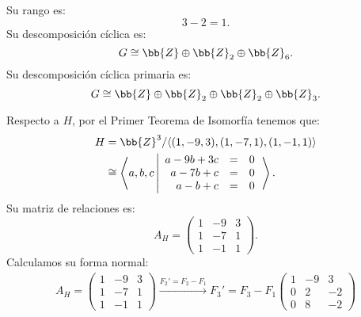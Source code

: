 \begin{ejercicio}
\begin{enumerate}
        Su rango es:
        \begin{equation*}
            3-2= 1.
        \end{equation*}
        Su descomposición cíclica es:
        \begin{equation*}
            G \cong \bb{Z}\oplus \bb{Z}_2 \oplus \bb{Z}_6.
        \end{equation*}
        Su descomposición cíclica primaria es:
        \begin{equation*}
            G \cong \bb{Z}\oplus  \bb{Z}_2 \oplus \bb{Z}_2 \oplus \bb{Z}_3.
        \end{equation*}

        Respecto a $H$, por el Primer Teorema de Isomorfía tenemos que:
        \begin{align*}
            H &= \bb{Z}^3/\langle(1, -9, 3),(1, -7, 1),(1, -1, 1)\rangle \\
            &\cong \left\langle a, b, c \left|
                \begin{array}{rcl}
                    a -9b + 3c &=& 0 \\
                    a -7b + c &=& 0 \\
                    a - b + c &=& 0
                \end{array}
            \right.\right\rangle.
        \end{align*}
        Su matriz de relaciones es:
        \begin{equation*}
            A_H = \begin{pmatrix}
                1 & -9 & 3 \\
                1 & -7 & 1 \\
                1 & -1 & 1
            \end{pmatrix}.
        \end{equation*}
        Calculamos su forma normal:
        \begin{multline*}
            A_H = \begin{pmatrix}
                1 & -9 & 3 \\
                1 & -7 & 1 \\
                1 & -1 & 1
            \end{pmatrix}
            \xrightarrow{F_2'=F_2-F_1}{F_3'=F_3-F_1}
            \begin{pmatrix}
                1 & -9 & 3 \\
                0 & 2 & -2 \\
                0 & 8 & -2
            \end{pmatrix}

\end{multline*}
\end{enumerate}
\end{ejercicio}
